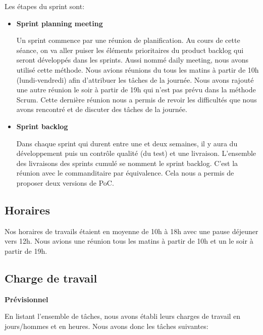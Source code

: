 Les étapes du sprint sont:
\begin{itemize}
    \item \textbf{Sprint planning meeting}

    Un sprint commence par une réunion de planification.
    Au cours de cette séance, on va aller puiser les éléments prioritaires du product backlog qui seront développés dans les sprints.
    Aussi nommé daily meeting, nous avons utilisé cette méthode.
    Nous avions réunions du tous les matins à partir de 10h (lundi-vendredi) afin d'attribuer les tâches de la journée.
    Nous avons rajouté une autre réunion le soir à partir de 19h qui n’est pas prévu dans la méthode Scrum.
    Cette dernière réunion nous a permis de revoir les difficultés que nous avons rencontré et de discuter des tâches de la journée. 
    \item \textbf{Sprint backlog}

    Dans chaque sprint qui durent entre une et deux semaines, il y aura du développement puis un contrôle qualité (du test) et une livraison.
    L'ensemble des livraisons des sprints cumulé se nomment le sprint backlog.
    C'est la réunion avec le commanditaire par équivalence.
    Cela nous a permis de proposer deux versions de PoC.   
\end{itemize}



\subsection{Horaires}
Nos horaires de travails étaient en moyenne de 10h à 18h avec une pause déjeuner vers 12h.
Nous avions une réunion tous les matins à partir de 10h et un le soir à partir de 19h.



\subsection{Charge de travail}

\textbf{Prévisionnel} 

En listant l'ensemble de tâches, nous avons établi leurs charges de travail en jours/hommes et en heures. 
Nous avons donc les tâches suivantes: 


